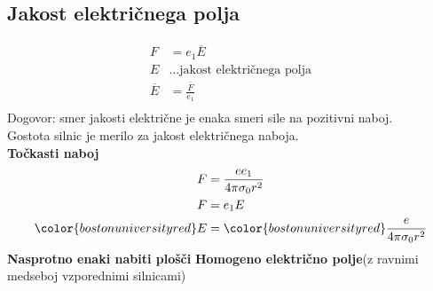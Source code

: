 {\color{indiagreen}\subsection{Jakost električnega polja}}
\begin{align*}
    F &= e_1 \overline{E}\\
    E &\dots \text{jakost električnega polja}\\
    \overline{E} &= \frac{\overline{F}}{e_1}\\
\end{align*}
Dogovor: smer jakosti električne je enaka smeri sile na pozitivni naboj.\\
Gostota silnic je merilo za jakost električnega naboja.\\
\textbf{Točkasti naboj}
\begin{align*}
    F &= \frac{e e_1}{4 \pi \sigma_0 r^2}\\
    F &= e_1 E\\
    {\color{bostonuniversityred}E} &= {\color{bostonuniversityred}\frac{e}{4 \pi \sigma_0 r^2}}\\
\end{align*}
\textbf{Nasprotno enaki nabiti plošči}
\textbf{Homogeno električno polje}(z ravnimi medseboj vzporednimi silnicami)
